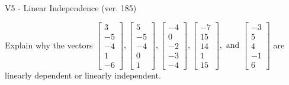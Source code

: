 \begin{exercise}
  \begin{exerciseTitle}V5 - Linear Independence (ver. 185)\end{exerciseTitle}
  \begin{exerciseStatement}
    Explain why the vectors \(\left[\begin{array}{r}
3 \\
-5 \\
-4 \\
1 \\
-6
\end{array}\right] , \left[\begin{array}{r}
5 \\
-5 \\
-4 \\
0 \\
1
\end{array}\right] , \left[\begin{array}{r}
-4 \\
0 \\
-2 \\
-3 \\
-4
\end{array}\right] , \left[\begin{array}{r}
-7 \\
15 \\
14 \\
1 \\
15
\end{array}\right] , \text{ and } \left[\begin{array}{r}
-3 \\
5 \\
4 \\
-1 \\
6
\end{array}\right]\) are linearly dependent or linearly independent.	



\end{exerciseStatement}
\end{exercise}
